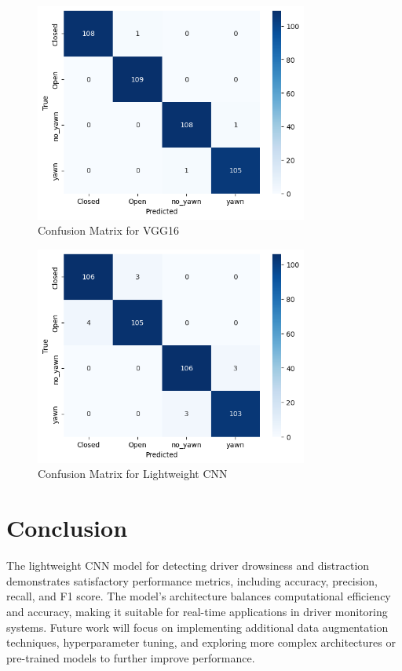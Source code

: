 \documentclass{report} %
\begin{document}
\begin{figure}[H]
  \centering
  \includegraphics[width=0.8\textwidth]{vgg_16_freeze.png}
  \caption{Confusion Matrix for VGG16}
  \end{figure}

  \begin{figure}[H]
    \centering
    \includegraphics[width=0.8\textwidth]{conf_cnn.png}
    \caption{Confusion Matrix for Lightweight CNN}
    \end{figure}



\section{Conclusion}

The lightweight CNN model for detecting driver drowsiness and distraction demonstrates satisfactory performance metrics, including accuracy, precision, recall, and F1 score. The model's architecture balances computational efficiency and accuracy, making it suitable for real-time applications in driver monitoring systems. Future work will focus on implementing additional data augmentation techniques, hyperparameter tuning, and exploring more complex architectures or pre-trained models to further improve performance.
\end{document}
